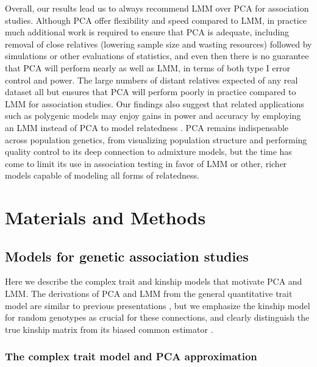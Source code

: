 \documentclass[11pt]{article}
\begin{document}
Overall, our results lead us to always recommend LMM over PCA for association studies.
Although PCA offer flexibility and speed compared to LMM, in practice much additional work is required to ensure that PCA is adequate, including removal of close relatives (lowering sample size and wasting resources) followed by simulations or other evaluations of statistics, and even then there is no guarantee that PCA will perform nearly as well as LMM, in terms of both type I error control and power.
The large numbers of distant relatives expected of any real dataset all but ensures that PCA will perform poorly in practice compared to LMM for association studies.
Our findings also suggest that related applications such as polygenic models may enjoy gains in power and accuracy by employing an LMM instead of PCA to model relatedness \citep{rakitsch_lasso_2013,qian_fast_2020}.
PCA remains indispensable across population genetics, from visualizing population structure and performing quality control to its deep connection to admixture models, but the time has come to limit its use in association testing in favor of LMM or other, richer models capable of modeling all forms of relatedness.

\section{Materials and Methods}

\subsection{Models for genetic association studies}

Here we describe the complex trait and kinship models that motivate PCA and LMM.
The derivations of PCA and LMM from the general quantitative trait model are similar to previous presentations \citep{astle_population_2009, hoffman_correcting_2013}, but we emphasize the kinship model for random genotypes as crucial for these connections, and clearly distinguish the true kinship matrix from its biased common estimator \citep{ochoa_estimating_2021, ochoa_human}.

\subsubsection{The complex trait model and PCA approximation}
\end{document}
